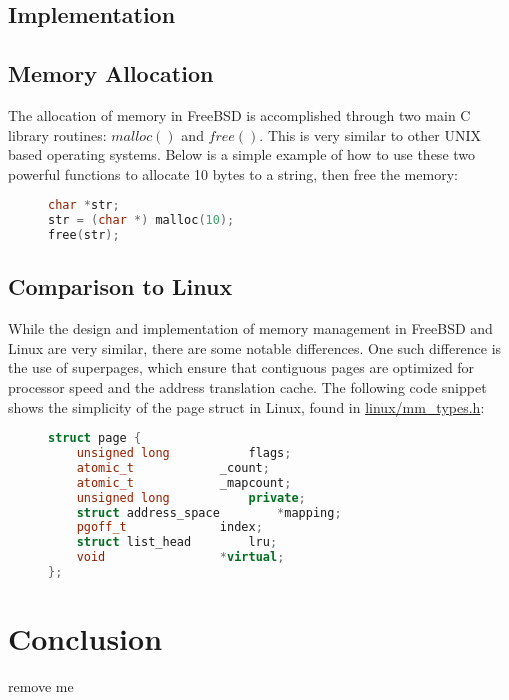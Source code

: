 \documentclass[letterpaper,draftclsnofoot,10pt,onecolumn,titlepage]{IEEEtran}\usepackage[margin=0.75in]{geometry}
\begin{document}
\subsection{Implementation}

\subsection{Memory Allocation}
The allocation of memory in FreeBSD is accomplished through two main C library routines: $malloc()$ and $free()$.
This is very similar to other UNIX based operating systems. Below is a simple example of how to use these 
two powerful functions to allocate 10 bytes to a string, then free the memory:

\begin{figure}[H]
\begin{lstlisting}[language=C++]
char *str;
str = (char *) malloc(10);
free(str);
\end{lstlisting}
\end{figure}

\subsection{Comparison to Linux}
While the design and implementation of memory management in FreeBSD and Linux are very similar, there are 
some notable differences. One such difference is the use of superpages, which ensure that contiguous pages 
are optimized for processor speed and the address translation cache. The following code snippet shows the 
simplicity of the page struct in Linux, found in \url{linux/mm_types.h}:

\begin{figure}[H]
\begin{lstlisting}[language=C++]
struct page {
	unsigned long 			flags;
	atomic_t			_count;
	atomic_t			_mapcount;
	unsigned long			private;
	struct address_space		*mapping;
	pgoff_t				index;
	struct list_head		lru;
	void				*virtual;
};
\end{lstlisting}
\end{figure}


\section{Conclusion}


remove me\cite{Windows}


\end{document}
